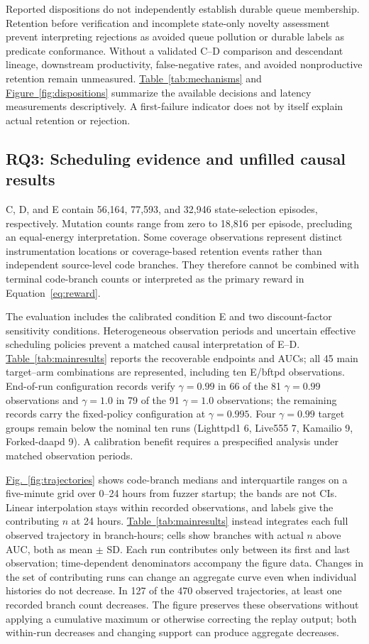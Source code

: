 \documentclass[final,5p,times,number]{elsarticle}
\newcommand{\namedref}[2]{\hyperref[#2]{#1~\ref*{#2}}}
\newcommand{\figref}[1]{\namedref{Fig.}{#1}}
\begin{document}
Reported dispositions do not independently establish durable queue membership. Retention before verification and incomplete state-only novelty assessment prevent interpreting rejections as avoided queue pollution or durable labels as predicate conformance. Without a validated C--D comparison and descendant lineage, downstream productivity, false-negative rates, and avoided nonproductive retention remain unmeasured. \namedref{Table}{tab:mechanisms} and \namedref{Figure}{fig:dispositions} summarize the available decisions and latency measurements descriptively. A first-failure indicator does not by itself explain actual retention or rejection.

\subsection{RQ3: Scheduling evidence and unfilled causal results}
C, D, and E contain 56,164, 77,593, and 32,946 state-selection episodes, respectively. Mutation counts range from zero to 18,816 per episode, precluding an equal-energy interpretation. Some coverage observations represent distinct instrumentation locations or coverage-based retention events rather than independent source-level code branches. They therefore cannot be combined with terminal code-branch counts or interpreted as the primary reward in Equation~\ref{eq:reward}.

The evaluation includes the calibrated condition E and two discount-factor sensitivity conditions. Heterogeneous observation periods and uncertain effective scheduling policies prevent a matched causal interpretation of E--D. \namedref{Table}{tab:mainresults} reports the recoverable endpoints and AUCs; all 45 main target--arm combinations are represented, including ten E/bftpd observations. End-of-run configuration records verify $\gamma=0.99$ in 66 of the 81 $\gamma=0.99$ observations and $\gamma=1.0$ in 79 of the 91 $\gamma=1.0$ observations; the remaining records carry the fixed-policy configuration at $\gamma=0.995$. Four $\gamma=0.99$ target groups remain below the nominal ten runs (Lighttpd1 6, Live555 7, Kamailio 9, Forked-daapd 9). A calibration benefit requires a prespecified analysis under matched observation periods.

\figref{fig:trajectories} shows code-branch medians and interquartile ranges on a five-minute grid over 0--24 hours from fuzzer startup; the bands are not CIs. Linear interpolation stays within recorded observations, and labels give the contributing $n$ at 24 hours. \namedref{Table}{tab:mainresults} instead integrates each full observed trajectory in branch-hours; cells show branches with actual $n$ above AUC, both as mean $\pm$ SD. Each run contributes only between its first and last observation; time-dependent denominators accompany the figure data. Changes in the set of contributing runs can change an aggregate curve even when individual histories do not decrease. In 127 of the 470 observed trajectories, at least one recorded branch count decreases. The figure preserves these observations without applying a cumulative maximum or otherwise correcting the replay output; both within-run decreases and changing support can produce aggregate decreases.
\end{document}
